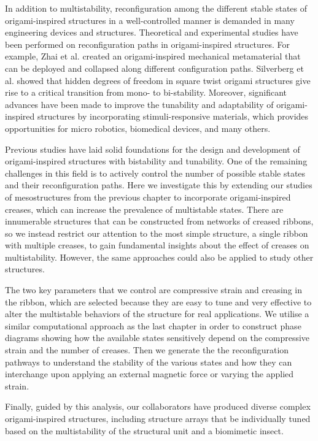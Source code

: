 In addition to multistability, reconfiguration among the different stable states of origami-inspired structures in a well-controlled manner is demanded in many engineering devices and structures.
Theoretical and experimental studies have been performed on reconfiguration paths in origami-inspired structures.
For example,  Zhai et al. created an origami-inspired mechanical metamaterial that can be deployed and collapsed along different configuration paths\cite{Zhai2018}.
Silverberg et al. showed that hidden degrees of freedom in square twist origami structures give rise to a critical transition from mono- to bi-stability\cite{Silverberg2015}.
Moreover, significant advances have been made to improve the tunability and adaptability of origami-inspired structures by incorporating stimuli-responsive materials, which provides opportunities for micro robotics, biomedical devices, and many others\cite{Jamal2013,Chen2020,Xu2017,Novelino2020,Xu2017a}.

Previous studies have laid solid foundations for the design and development of origami-inspired structures with bistability and tunability.
One of the remaining challenges in this field is to actively control the number of possible stable states and their reconfiguration paths.
Here we investigate this by extending our studies of mesostructures from the previous chapter to incorporate origami-inspired creases, which can increase the prevalence of multistable states.
There are innumerable structures that can be constructed from networks of creased ribbons, so we instead restrict our attention to the most simple structure, a single ribbon with multiple creases, to gain fundamental insights about the effect of creases on multistability.
However, the same approaches could also be applied to study other structures.

The two key parameters that we control are compressive strain and creasing in the ribbon, which are selected because they are easy to tune and very effective to alter the multistable behaviors of the structure for real applications.
We utilise a similar computational approach as the last chapter in order to construct phase diagrams showing how the available states sensitively depend on the compressive strain and the number of creases.
Then we generate the the reconfiguration pathways to understand the stability of the various states and how they can interchange upon applying an external magnetic force or varying the applied strain.

Finally, guided by this analysis, our collaborators have produced diverse complex origami-inspired structures, including structure arrays that be individually tuned based on the multistability of the structural unit and a biomimetic insect.



